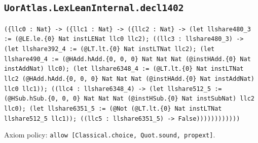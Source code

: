 \documentclass[11pt]{article}
\begin{document}
\subsection*{\texttt{UorAtlas.LexLeanInternal.decl1402}}
\noindent\texttt{(\{llc0 : Nat\} -> (\{llc1 : Nat\} -> (\{llc2 : Nat\} -> (let llshare480\_3 := (@LE.le.\{0\} Nat instLENat llc0 llc2); ((llc3 : llshare480\_3) -> (let llshare392\_4 := (@LT.lt.\{0\} Nat instLTNat llc2); (let llshare490\_4 := (@HAdd.hAdd.\{0, 0, 0\} Nat Nat Nat (@instHAdd.\{0\} Nat instAddNat) llc0); (let llshare6348\_4 := (@LT.lt.\{0\} Nat instLTNat llc2 (@HAdd.hAdd.\{0, 0, 0\} Nat Nat Nat (@instHAdd.\{0\} Nat instAddNat) llc0 llc1)); ((llc4 : llshare6348\_4) -> (let llshare512\_5 := (@HSub.hSub.\{0, 0, 0\} Nat Nat Nat (@instHSub.\{0\} Nat instSubNat) llc2 llc0); (let llshare6351\_5 := (@Not (@LT.lt.\{0\} Nat instLTNat llshare512\_5 llc1)); ((llc5 : llshare6351\_5) -> False))))))))))))}\par
\noindent Axiom policy: \texttt{allow [Classical.choice, Quot.sound, propext]}.\par
\end{document}
